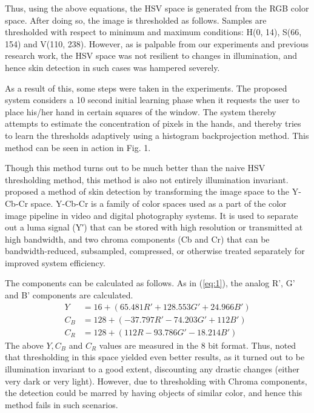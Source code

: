 \documentclass[letterpaper, 10 pt, twoside, conference]{ieeeconf}
\begin{document}
Thus, using the above equations, the HSV space is generated from the RGB color space.
After doing so, the image is thresholded as follows. Samples are thresholded with respect
to minimum and maximum conditions: H(0, 14), S(66, 154) and V(110, 238).
However, as is palpable from our experiments and previous research work, the HSV space
was not resilient to changes in illumination, and hence skin detection in such cases
was hampered severely.

As a result of this, some steps were taken in the experiments. The proposed system considers
a 10 second initial learning phase when it requests the user to place his/her hand in certain
squares of the window. The system thereby attempts to estimate the concentration of pixels in the
hands, and thereby tries to learn the thresholds adaptively using a histogram backprojection method.
This method can be seen in action in Fig. 1.

Though this method turns out to be much better than the naive HSV thresholding method, this method is
also not entirely illumination invariant. \cite{Chai1999} proposed a method of skin detection by transforming
the image space to the Y-Cb-Cr space. Y-Cb-Cr is a family of color spaces used as a part of the color image
pipeline in video and digital photography systems. It is used to separate out a luma signal (Y′) that can be 
stored with high resolution or transmitted at high bandwidth, and two chroma components (Cb and Cr) 
that can be bandwidth-reduced, subsampled, compressed, or otherwise treated separately for improved system efficiency.

The components can be calculated as follows. As in (\ref{eq:1}), the analog R', G' and B' components are calculated.
\[
  \begin{split}
    Y &= 16 + (65.481R' + 128.553G' + 24.966B')
    \\
    C_B &= 128 + (-37.797R' - 74.203G' + 112B')
    \\
    C_R &= 128 + (112R - 93.786G' - 18.214B')
  \end{split}
\]
The above $Y,C_B$ and $C_R$ values are measured in the 8 bit format. Thus, \cite{Chai1999} noted that thresholding
in this space yielded even better results, as it turned out to be illumination invariant to a good extent,
discounting any drastic changes (either very dark or very light). However, due to thresholding with Chroma
components, the detection could be marred by having objects of similar color, and hence this method fails
in such scenarios. 
\end{document}
